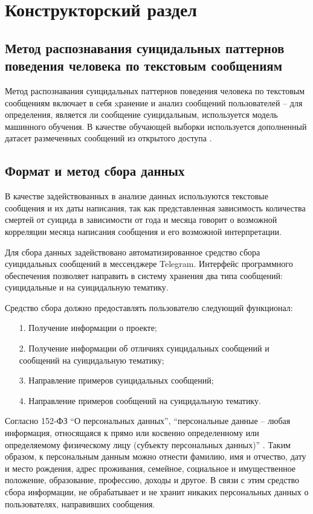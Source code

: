 \section{Конструкторский раздел}

\subsection{Метод распознавания суицидальных паттернов поведения человека по текстовым сообщениям}

Метод распознавания суицидальных паттернов поведения человека по текстовым сообщениям включает в себя xранение и анализ сообщений пользователей -- для определения, является ли сообщение суицидальным, используется модель машинного обучения. В качестве обучающей выборки используется дополненный датасет размеченных сообщений из открытого доступа \cite{dataset}.

\subsection{Формат и метод сбора данных}

В качестве задействованных в анализе данных используются текстовые сообщения и их даты написания, так как представленная зависимость количества смертей от суицида в зависимости от года и месяца говорит о возможной корреляции месяца написания сообщения и его возможной интерпретации.

Для сбора данных задействовано автоматизированное средство сбора суицидальных сообщений в мессенджере Telegram. Интерфейс программного обеспечения позволяет направить в систему хранения два типа сообщений: суицидальные и на суицидальную тематику.

Средство сбора должно предоставлять пользователю следующий функционал:

\begin{enumerate}
\item[1.] Получение информации о проекте;
\item[2.] Получение информации об отличиях суицидальных сообщений и сообщений на суицидальную тематику;
\item[3.] Направление примеров суицидальных сообщений;
\item[4.] Направление примеров сообщений на суицидальную тематику.
\end{enumerate}

Согласно 152-ФЗ ``О персональных данных'', ``персональные данные -- любая информация, относящаяся к прямо или косвенно определенному или определяемому физическому лицу (субъекту персональных данных)'' \cite{fzpers}. Таким образом, к персональным данным можно отнести фамилию, имя и отчество, дату и место рождения, адрес проживания, семейное, социальное и имущественное положение, образование, профессию, доходы и другое. В связи с этим средство сбора информации, не обрабатывает и не хранит никаких персональных данных о пользователях, направивших сообщения.

